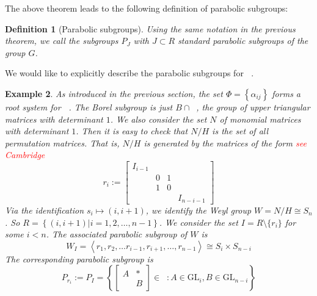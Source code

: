 \documentclass[12pt]{article} %
\newtheorem{definition}{Definition}[section]
\newtheorem{example}[definition]{Example}
\DeclareMathOperator{\SLn}{\text{SL}_n(\mathbb{R})}
\begin{document}
The above theorem leads to the following definition of parabolic subgroups:
\begin{definition}[Parabolic subgroups]
    Using the same notation in the previous theorem, we call the subgroups $P_J$ with $J \subset R$  \textit{standard parabolic subgroups} of the group $G$.
\end{definition}
We would like to explicitly describe the parabolic subgroups for $\SLn$.
\begin{example}
    As introduced in the previous section, the set $\Phi = \left\lbrace \alpha_{ij}\right\rbrace $ forms a
    root system for $\SLn$. The Borel subgroup is just $B \cap \SLn$, the group of upper triangular matrices with determinant $1$.
    We also consider the set $N$ of monomial matrices  with determinant $1$. Then it is easy to check that
    $N/H$ is the set of all permutation matrices. That is, $N/H$ is generated by the
    matrices of the form \textcolor{red}{see Cambridge}
    \[r_i := \begin{bmatrix}
            I_{i-1} &   &   &           \\
                    & 0 & 1 &           \\
                    & 1 & 0 &           \\
                    &   &   & I_{n-i-1}
        \end{bmatrix}\]
    Via the identification $s_i \mapsto (i,i+1)$, we identify  the Weyl group $W = N/H \cong S_n$. So
    $R = \left\lbrace (i,i+1)| i = 1,2,\ldots,n-1\right\rbrace $. We consider the set
    $I = R \setminus \{r_i\}$ for some $i<n$. The associated parabolic subgroup of
    $W$ is
    \[W_I = \left\langle r_1,r_2,\ldots r_{i-1},r_{i+1},\ldots, r_{n-1} \right\rangle \cong
        S_i \times S_{n-i}\]
    The corresponding parabolic subgroup is
    \[P_{r_i} := P_I = \left\lbrace \begin{bmatrix}
            A & \ast \\
              & B
        \end{bmatrix} \in \SLn: A \in \text{GL}_i, B \in \text{GL}_{n-i}\right\rbrace \]
\end{example}
\end{document}
